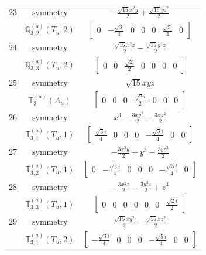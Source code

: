 \documentclass[fleqn,8pt,landscape]{jsarticle}
\begin{document}
\begin{longtable}{ccc}
$ 23 $ & $ \text{symmetry} $ & $ - \frac{\sqrt{15} x^{2} y}{2} + \frac{\sqrt{15} y z^{2}}{2} $ \\
$  $ & $ \mathbb{Q}_{3,2}^{(a)}(T_{u},2) $ & $ \begin{bmatrix} 0 & - \frac{\sqrt{3}}{4} & 0 & 0 & 0 & \frac{\sqrt{5}}{4} & 0 \end{bmatrix} $ \\ \hline
$ 24 $ & $ \text{symmetry} $ & $ \frac{\sqrt{15} x^{2} z}{2} - \frac{\sqrt{15} y^{2} z}{2} $ \\
$  $ & $ \mathbb{Q}_{3,3}^{(a)}(T_{u},2) $ & $ \begin{bmatrix} 0 & 0 & \frac{\sqrt{2}}{2} & 0 & 0 & 0 & 0 \end{bmatrix} $ \\ \hline
$ 25 $ & $ \text{symmetry} $ & $ \sqrt{15} x y z $ \\
$  $ & $ \mathbb{T}_{3}^{(a)}(A_{u}) $ & $ \begin{bmatrix} 0 & 0 & 0 & \frac{\sqrt{2} i}{2} & 0 & 0 & 0 \end{bmatrix} $ \\ \hline
$ 26 $ & $ \text{symmetry} $ & $ x^{3} - \frac{3 x y^{2}}{2} - \frac{3 x z^{2}}{2} $ \\
$  $ & $ \mathbb{T}_{3,1}^{(a)}(T_{u},1) $ & $ \begin{bmatrix} \frac{\sqrt{5} i}{4} & 0 & 0 & 0 & - \frac{\sqrt{3} i}{4} & 0 & 0 \end{bmatrix} $ \\ \hline
$ 27 $ & $ \text{symmetry} $ & $ - \frac{3 x^{2} y}{2} + y^{3} - \frac{3 y z^{2}}{2} $ \\
$  $ & $ \mathbb{T}_{3,2}^{(a)}(T_{u},1) $ & $ \begin{bmatrix} 0 & - \frac{\sqrt{5} i}{4} & 0 & 0 & 0 & - \frac{\sqrt{3} i}{4} & 0 \end{bmatrix} $ \\ \hline
$ 28 $ & $ \text{symmetry} $ & $ - \frac{3 x^{2} z}{2} - \frac{3 y^{2} z}{2} + z^{3} $ \\
$  $ & $ \mathbb{T}_{3,3}^{(a)}(T_{u},1) $ & $ \begin{bmatrix} 0 & 0 & 0 & 0 & 0 & 0 & \frac{\sqrt{2} i}{2} \end{bmatrix} $ \\ \hline
$ 29 $ & $ \text{symmetry} $ & $ \frac{\sqrt{15} x y^{2}}{2} - \frac{\sqrt{15} x z^{2}}{2} $ \\
$  $ & $ \mathbb{T}_{3,1}^{(a)}(T_{u},2) $ & $ \begin{bmatrix} - \frac{\sqrt{3} i}{4} & 0 & 0 & 0 & - \frac{\sqrt{5} i}{4} & 0 & 0 \end{bmatrix} $ \\ \hline

\end{longtable}
\end{document}
